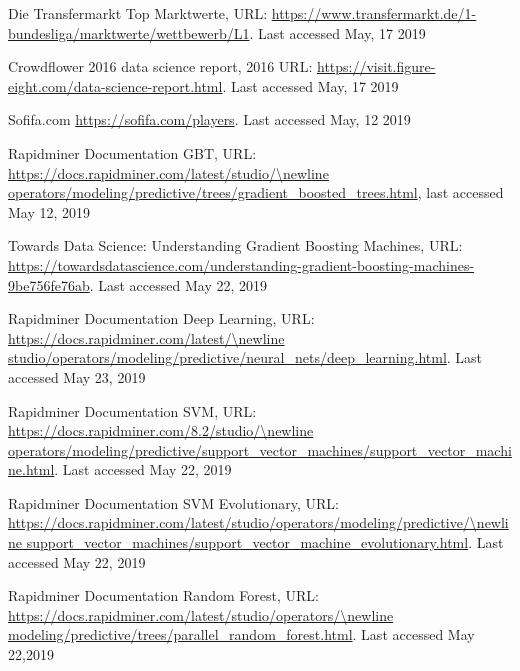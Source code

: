 \documentclass[runningheads]{llncs}
\begin{document}


%
\begin{thebibliography}{8}

Die Transfermarkt Top Marktwerte, URL: \url{https://www.transfermarkt.de/1-bundesliga/marktwerte/wettbewerb/L1}. Last accessed May, 17 2019

Crowdflower 2016 data science report, 2016   URL: \url{https://visit.figure-eight.com/data-science-report.html}. Last accessed May, 17 2019

Sofifa.com \url{https://sofifa.com/players}. Last accessed May, 12 2019

Rapidminer Documentation GBT, URL: \url{https://docs.rapidminer.com/latest/studio/\newline operators/modeling/predictive/trees/gradient\_boosted\_trees.html}, last accessed May 12, 2019


Towards Data Science: Understanding Gradient Boosting Machines, URL:  \url{https://towardsdatascience.com/understanding-gradient-boosting-machines-9be756fe76ab}. Last accessed May 22, 2019

Rapidminer Documentation Deep Learning, URL: \url{https://docs.rapidminer.com/latest/\newline studio/operators/modeling/predictive/neural\_nets/deep\_learning.html}. Last accessed May 23, 2019

Rapidminer Documentation SVM, URL: \url{https://docs.rapidminer.com/8.2/studio/\newline operators/modeling/predictive/support\_vector\_machines/support\_vector\_machine.html}. Last accessed May 22, 2019

Rapidminer Documentation SVM Evolutionary, URL: \url{https://docs.rapidminer.com/latest/studio/operators/modeling/predictive/\newline support\_vector\_machines/support\_vector\_machine\_evolutionary.html}. Last accessed May 22, 2019

Rapidminer Documentation Random Forest, URL: \url{https://docs.rapidminer.com/latest/studio/operators/\newline modeling/predictive/trees/parallel\_random\_forest.html}. Last accessed May 22,2019


\end{thebibliography}
\end{document}
